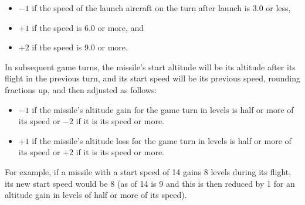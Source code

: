 {\begin{itemize}

    \item $-1$ if the speed of the launch aircraft on the turn after launch is 3.0 or less,

    \item $+1$ if the speed is 6.0 or more, and

    \item $+2$ if the speed is 9.0 or more.
\end{itemize}

In subsequent game turns, the missile's start altitude will be its altitude after its flight in the previous turn, and its start speed will be {\twothirds} its previous speed, rounding fractions up, and then adjusted as follows:

\begin{itemize}

    \item $-1$ if the missile's altitude gain for the game turn in levels is half or more of its speed or $-2$ if it is its speed or more.

    \item $+1$ if the missile's altitude loss for the game turn in levels is half or more of its speed or $+2$ if it is its speed or more.

\end{itemize}

For example, if a missile with a start speed of 14 gains 8 levels during its flight, its new start speed would be 8 (as { \twothirds} of 14 is 9 and this is then reduced by 1 for an altitude gain in levels of half or more of its speed).
}

